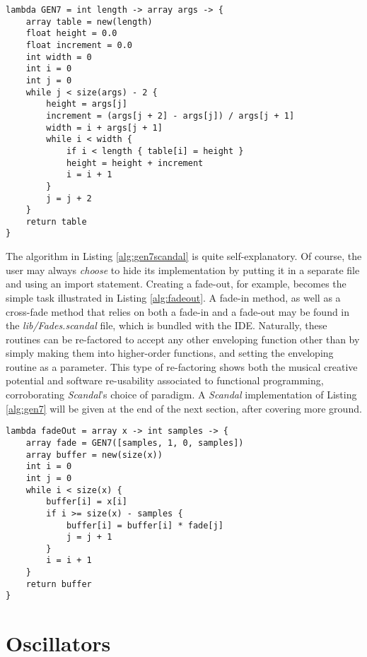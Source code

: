 \begin{lstlisting}[emph={lambda,array,int,float,new,while,size,if,return},emphstyle={\textbf},caption={A \emph{Scandal} implementation of \il{GEN7}.},label={alg:gen7scandal}]
lambda GEN7 = int length -> array args -> {
	array table = new(length)
	float height = 0.0
	float increment = 0.0
	int width = 0
	int i = 0
	int j = 0
	while j < size(args) - 2 {
		height = args[j]
		increment = (args[j + 2] - args[j]) / args[j + 1]
		width = i + args[j + 1]
		while i < width {
			if i < length { table[i] = height }
			height = height + increment
			i = i + 1
		}
		j = j + 2
	}
	return table
}
\end{lstlisting}

The algorithm in Listing \ref{alg:gen7scandal} is quite self-explanatory. Of course, the user may always \emph{choose} to hide its implementation by putting it in a separate file and using an import statement. Creating a fade-out, for example, becomes the simple task illustrated in Listing \ref{alg:fadeout}. A fade-in method, as well as a cross-fade method that relies on both a fade-in and a fade-out may be found in the \emph{lib/Fades.scandal} file, which is bundled with the IDE. Naturally, these routines can be re-factored to accept any other enveloping function other than  by simply making them into higher-order functions, and setting the enveloping routine as a parameter. This type of re-factoring shows both the musical creative potential and software re-usability associated to functional programming, corroborating \emph{Scandal}'s choice of paradigm. A \emph{Scandal} implementation of Listing \ref{alg:gen7} will be given at the end of the next section, after covering more ground.

\begin{lstlisting}[emph={lambda,array,int,new,while,size,if,return},emphstyle={\textbf},caption={Implementation of a fade-out effect.},label={alg:fadeout}]
lambda fadeOut = array x -> int samples -> {
	array fade = GEN7([samples, 1, 0, samples])
	array buffer = new(size(x))
	int i = 0
	int j = 0
	while i < size(x) {
		buffer[i] = x[i]
		if i >= size(x) - samples {
			buffer[i] = buffer[i] * fade[j]
			j = j + 1
		}
		i = i + 1
	}
	return buffer
}
\end{lstlisting}

\section{Oscillators}

